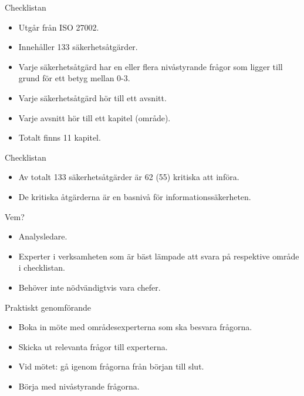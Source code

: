 \documentclass{beamer}
\begin{document}
\begin{frame}{Checklistan}
  \begin{itemize}
    \item Utgår från ISO 27002.
    \item Innehåller 133 säkerhetsåtgärder.
    \item Varje säkerhetsåtgärd har en eller flera nivåstyrande frågor som 
      ligger till grund för ett betyg mellan 0-3.
    \item Varje säkerhetsåtgärd hör till ett avsnitt.
    \item Varje avsnitt hör till ett kapitel (område).
    \item Totalt finns 11 kapitel.
  \end{itemize}
\end{frame}
\begin{frame}{Checklistan}
  \begin{itemize}
    \item Av totalt 133 säkerhetsåtgärder är 62 (55) kritiska att införa.
    \item De kritiska åtgärderna är en basnivå för informationssäkerheten.
  \end{itemize}
\end{frame}
\begin{frame}{Vem?}
  \begin{itemize}
    \item Analysledare.
    \item Experter i verksamheten som är bäst lämpade att svara på respektive 
      område i checklistan.
    \item Behöver inte nödvändigtvis vara chefer.
  \end{itemize}
\end{frame}
\begin{frame}{Praktiskt genomförande}
  \begin{itemize}
    \item Boka in möte med områdesexperterna som ska besvara frågorna.
    \item Skicka ut relevanta frågor till experterna.
    \item Vid mötet: gå igenom frågorna från början till slut.
    \item Börja med nivåstyrande frågorna.
  \end{itemize}
\end{frame}
\end{document}
